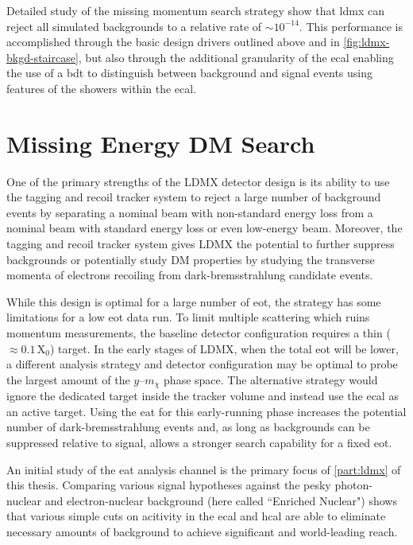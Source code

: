 Detailed study of the missing momentum search strategy\cite{ldmx-whitepaper,ldmx-photon-reject-2020,ldmx-8gev-2023} show that \ac{ldmx} can reject all simulated backgrounds to a relative rate of $\sim 10^{-14}$.
This performance is accomplished through the basic design drivers outlined above and in \cref{fig:ldmx-bkgd-staircase}, but also through the additional granularity of the \ac{ecal} enabling
the use of a \ac{bdt} to distinguish between background and signal events using features of the
showers within the \ac{ecal}.

\section{Missing Energy DM Search}
One of the primary strengths of the LDMX detector design is its ability to use the tagging
and recoil tracker system to reject a large number of background events by separating a nominal
beam with non-standard energy loss from a nominal beam with standard energy loss or even low-energy
beam. Moreover, the tagging and recoil tracker system gives LDMX the potential to further suppress
backgrounds or potentially study DM properties by studying the transverse momenta of electrons
recoiling from dark-bremsstrahlung candidate events.

While this design is optimal for a large number of \ac{eot}, the strategy has some limitations for a low
\ac{eot} data run. To limit multiple scattering which ruins momentum measurements, the baseline detector
configuration requires a thin ($\approx 0.1 \,\mathrm{X}_0$) target. In the early stages of
LDMX, when the total \ac{eot} will be lower, a different analysis strategy and detector configuration
may be optimal to probe the largest amount of the $y$--$m_\chi$ phase space. The alternative
strategy would ignore the dedicated target inside the tracker volume and instead use the \ac{ecal} as an
active target. Using the \ac{eat} for this early-running phase increases the potential
number of dark-bremsstrahlung events and, as long as backgrounds can be suppressed relative to
signal, allows a stronger search capability for a fixed \ac{eot}.

An initial study of the \ac{eat} analysis channel is the primary focus of \cref{part:ldmx} of this thesis. Comparing various signal hypotheses against the pesky photon-nuclear and electron-nuclear background (here called ``Enriched Nuclear") shows that various simple cuts on acitivity in the
\ac{ecal} and \ac{hcal} are able to eliminate necessary amounts of background to achieve significant
and world-leading reach.

